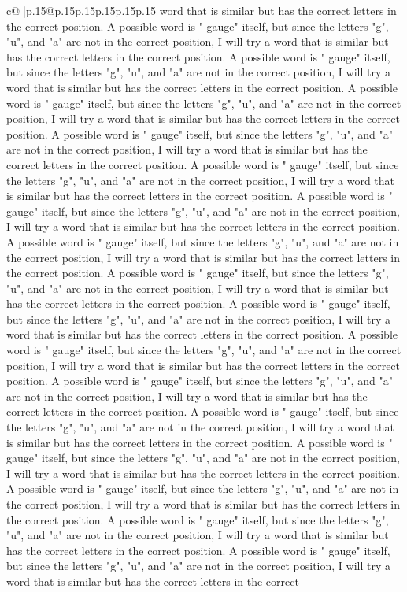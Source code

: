 \documentclass{article}
\begin{document}
{\begin{supertabular}{c@{$\;$}|p{.15\linewidth}@{}p{.15\linewidth}p{.15\linewidth}p{.15\linewidth}p{.15\linewidth}p{.15\linewidth}}
{{{word that is similar but has the correct letters in the correct position. A possible word is " gauge" itself, but since the letters "g", "u", and "a" are not in the correct position, I will try a word that is similar but has the correct letters in the correct position. A possible word is " gauge" itself, but since the letters "g", "u", and "a" are not in the correct position, I will try a word that is similar but has the correct letters in the correct position. A possible word is " gauge" itself, but since the letters "g", "u", and "a" are not in the correct position, I will try a word that is similar but has the correct letters in the correct position. A possible word is " gauge" itself, but since the letters "g", "u", and "a" are not in the correct position, I will try a word that is similar but has the correct letters in the correct position. A possible word is " gauge" itself, but since the letters "g", "u", and "a" are not in the correct position, I will try a word that is similar but has the correct letters in the correct position. A possible word is " gauge" itself, but since the letters "g", "u", and "a" are not in the correct position, I will try a word that is similar but has the correct letters in the correct position. A possible word is " gauge" itself, but since the letters "g", "u", and "a" are not in the correct position, I will try a word that is similar but has the correct letters in the correct position. A possible word is " gauge" itself, but since the letters "g", "u", and "a" are not in the correct position, I will try a word that is similar but has the correct letters in the correct position. A possible word is " gauge" itself, but since the letters "g", "u", and "a" are not in the correct position, I will try a word that is similar but has the correct letters in the correct position. A possible word is " gauge" itself, but since the letters "g", "u", and "a" are not in the correct position, I will try a word that is similar but has the correct letters in the correct position. A possible word is " gauge" itself, but since the letters "g", "u", and "a" are not in the correct position, I will try a word that is similar but has the correct letters in the correct position. A possible word is " gauge" itself, but since the letters "g", "u", and "a" are not in the correct position, I will try a word that is similar but has the correct letters in the correct position. A possible word is " gauge" itself, but since the letters "g", "u", and "a" are not in the correct position, I will try a word that is similar but has the correct letters in the correct position. A possible word is " gauge" itself, but since the letters "g", "u", and "a" are not in the correct position, I will try a word that is similar but has the correct letters in the correct position. A possible word is " gauge" itself, but since the letters "g", "u", and "a" are not in the correct position, I will try a word that is similar but has the correct letters in the correct position. A possible word is " gauge" itself, but since the letters "g", "u", and "a" are not in the correct position, I will try a word that is similar but has the correct letters in the correct }}}
\end{supertabular}}
\end{document}
